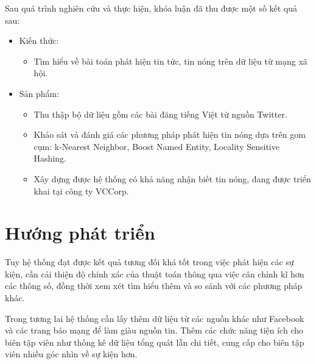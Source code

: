 Sau quá trình nghiên cứu và thực hiện, khóa luận đã thu được một số kết quả sau:
	\begin{itemize}
		\item Kiến thức:
		\begin{itemize}
			\item Tìm hiểu về bài toán phát hiện tin tức, tin nóng trên dữ liệu từ mạng xã hội.
		\end{itemize}
		
		\item Sản phẩm:
		\begin{itemize}
			\item Thu thập bộ dữ liệu gồm các bài đăng tiếng Việt từ nguồn Twitter.
			\item Khảo sát và đánh giá các phương pháp phát hiện tin nóng dựa trên gom cụm: k-Nearest Neighbor, Boost Named Entity, Locality Sensitive Hashing.
			\item Xây dựng được hệ thống có khả năng nhận biết tin nóng, đang được triển khai tại công ty VCCorp.
		\end{itemize}
	\end{itemize}

\section*{Hướng phát triển}
Tuy hệ thống đạt được kết quả tương đối khá tốt trong việc phát hiện các sự kiện, cần cải thiện độ chính xác của thuật toán thông qua việc cân chỉnh kĩ hơn các thông số, đồng thời xem xét tìm hiểu thêm và so sánh với các phương pháp khác.

Trong tương lai hệ thống cần lấy thêm dữ liệu từ các nguồn khác như Facebook và các trang báo mạng để làm giàu nguồn tin. Thêm các chức năng tiện ích cho biên tập viên như thống kê dữ liệu tổng quát lẫn chi tiết, cung cấp cho biên tập viên nhiều góc nhìn về sự kiện hơn.

